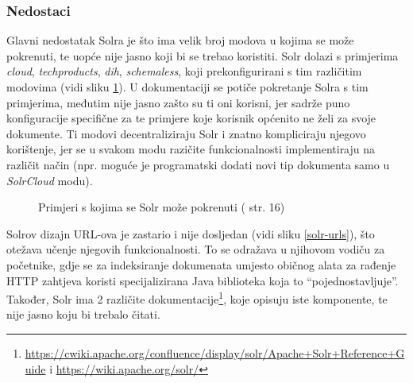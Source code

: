 \documentclass[a4paper,twoside,12pt]{scrreprt}
\begin{document}
\subsubsection{Nedostaci}

Glavni nedostatak Solra je što ima velik broj modova u kojima se može pokrenuti, te uopće nije jasno koji bi se trebao koristiti. Solr dolazi s primjerima \textit{cloud}, \textit{techproducts}, \textit{dih}, \textit{schemaless}, koji prekonfigurirani s tim različitim modovima (vidi sliku \ref{solr-modes}). U dokumentaciji se potiče pokretanje Solra s tim primjerima, međutim nije jasno zašto su ti oni korisni, jer sadrže puno konfiguracije specifične za te primjere koje korisnik općenito ne želi za svoje dokumente. Ti modovi decentraliziraju Solr i znatno kompliciraju njegovo korištenje, jer se u svakom modu razičite funkcionalnosti implementiraju na različit način (npr. moguće je programatski dodati novi tip dokumenta samo u \textit{SolrCloud} modu).

\begin{figure}[H]
  \centering
  \caption{Primjeri s kojima se Solr može pokrenuti (\cite{solr} str. 16)}
  \label{solr-modes}
\end{figure}

Solrov dizajn URL-ova je zastario i nije dosljedan (vidi sliku \ref{solr-urls}), što otežava učenje njegovih funkcionalnosti. To se odražava u njihovom vodiču za početnike, gdje se za indeksiranje dokumenata umjesto običnog alata za rađenje HTTP zahtjeva koristi specijalizirana Java biblioteka koja to ``pojednostavljuje''. Također, Solr ima 2 različite dokumentacije\footnote{\url{https://cwiki.apache.org/confluence/display/solr/Apache+Solr+Reference+Guide} i \url{https://wiki.apache.org/solr/}}, koje opisuju iste komponente, te nije jasno koju bi trebalo čitati.
\end{document}
